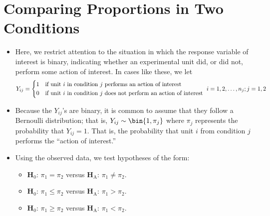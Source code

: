 \section{Comparing Proportions in Two Conditions}
\begin{itemize}
      \item Here, we restrict attention to the situation in which the response variable of interest
            is binary, indicating whether an experimental unit did, or did not, perform
            some action of interest. In cases like these, we let
            \[ Y_{ij}=\begin{cases*}
                        1 & if unit $ i $ in condition $ j $ performs an action of interest         \\
                        0 & if unit $ i $ in condition $ j $ does not perform an action of interest
                  \end{cases*}i=1,2,\ldots,n_j;j=1,2 \]
      \item Because the $ Y_{ij} $'s are binary, it is common to assume that they follow
            a Bernoulli distribution; that is, $ Y_{ij}\sim \bin{1,\pi_j} $ where
            $ \pi_j $ represents the probability that $ Y_{ij}=1 $. That is,
            the probability that unit $ i $ from condition $ j $ performs the ``action of interest.''
      \item Using the observed data, we test hypotheses of the form:
            \begin{itemize}
                  \item $ \mathbf{H}_0 $: $ \pi_1=\pi_2 $ versus $ \mathbf{H}_\text{A} $: $ \pi_1\ne\pi_2 $.
                  \item $ \mathbf{H}_0 $: $ \pi_1\le\pi_2 $ versus $ \mathbf{H}_\text{A} $: $ \pi_1>\pi_2 $.
                  \item $ \mathbf{H}_0 $: $ \pi_1\ge\pi_2 $ versus $ \mathbf{H}_\text{A} $: $ \pi_1<\pi_2 $.
            \end{itemize}
\end{itemize}
